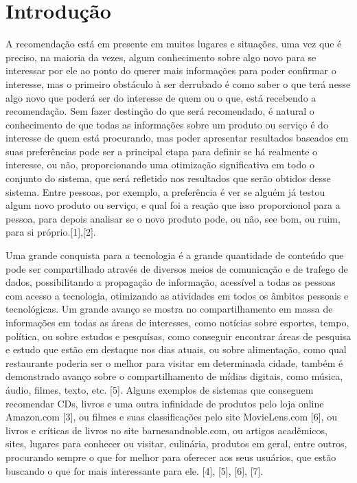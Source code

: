 \documentclass[12pt,
				openright,
				twoside,
				a4paper,
				apter=TITLE,
				section=TITLE,
				subsection=TITLE,
				chapter=TITLE,
				english,
				french,
				spanish,
				brazil]{abntex2}
\begin{document}
\chapter{Introdução}
A recomendação está em presente em muitos lugares e situações, uma vez que é preciso, na maioria da vezes, algum conhecimento sobre algo novo para se interessar por ele ao ponto do querer mais informações para poder confirmar o interesse, mas o primeiro obstáculo à ser derrubado é como saber o que terá nesse algo novo que poderá ser do interesse de quem ou o que, está recebendo a recomendação. Sem fazer destinção do que será recomendado, é natural o conhecimento de que todas as informações sobre um produto ou serviço é do interesse de quem está procurando, mas poder apresentar resultados baseados em suas preferências pode ser a principal etapa para definir se há realmente o interesse, ou não, proporcionando uma otimização significativa em todo o conjunto do sistema, que será refletido nos resultados que serão obtidos desse sistema. Entre pessoas, por exemplo, a preferência é ver se alguém já testou algum novo produto ou serviço, e qual foi a reação que isso proporcionol para a pessoa, para depois analisar se o novo produto pode, ou não, see bom, ou ruim, para si próprio.[1],[2].

Uma grande conquista para a tecnologia é a grande quantidade de conteúdo que pode ser compartilhado através de diversos meios de comunicação e de trafego de dados, possibilitando a propagação de informação, acessível a todas as pessoas com acesso a tecnologia, otimizando as atividades em todos os âmbitos pessoais e tecnológicas. Um grande avanço se mostra no compartilhamento em massa de informações em todas as áreas de interesses, como notícias sobre esportes, tempo, política, ou sobre estudos e pesquísas, como conseguir encontrar áreas de pesquisa e estudo que estão em destaque nos dias atuais, ou sobre alimentação, como qual restaurante poderia ser o melhor para visitar em determinada cidade, também é demonstrado avanço sobre o compartilhamento de mídias digitais, como música, áudio, filmes, texto, etc. [5]. Alguns exemplos de sistemas que conseguem recomendar CDs, livros e uma outra infinidade de produtos pelo loja online Amazon.com [3], ou filmes e suas classificações pelo site MovieLens.com [6], ou livros e críticas de livros no site barnesandnoble.com, ou artigos acadêmicos, sites, lugares para conhecer ou visitar, culinária, produtos em geral, entre outros, procurando sempre o que for melhor para oferecer aos seus usuários, que estão buscando o que for mais interessante para ele. [4], [5], [6], [7].
\end{document}
